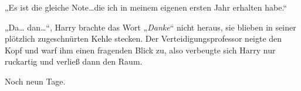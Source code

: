 „Es ist die gleiche Note…die ich in meinem eigenen ersten Jahr erhalten habe.“

„Da… dan…“,
Harry brachte das Wort „\emph{Danke}“ nicht heraus, sie blieben in seiner plötzlich zugeschnürten Kehle stecken.
Der Verteidigungsprofessor neigte den Kopf und warf ihm einen fragenden Blick zu, also verbeugte sich Harry nur ruckartig und verließ dann den Raum.

Noch neun Tage.

